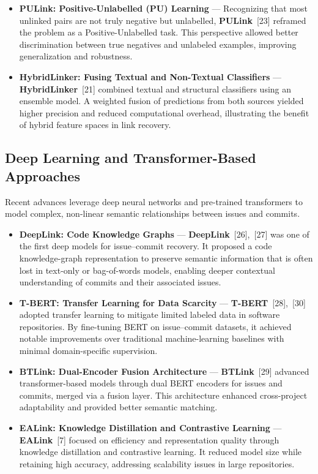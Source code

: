 \begin{itemize}
    \item \textbf{PULink: Positive-Unlabelled (PU) Learning} --- Recognizing that most unlinked pairs are not truly negative but unlabelled, \textbf{PULink}~[23] reframed the problem as a Positive-Unlabelled task. This perspective allowed better discrimination between true negatives and unlabeled examples, improving generalization and robustness.
    \item \textbf{HybridLinker: Fusing Textual and Non-Textual Classifiers} --- \textbf{HybridLinker}~[21] combined textual and structural classifiers using an ensemble model. A weighted fusion of predictions from both sources yielded higher precision and reduced computational overhead, illustrating the benefit of hybrid feature spaces in link recovery.
\end{itemize}

\subsection{Deep Learning and Transformer-Based Approaches}
Recent advances leverage deep neural networks and pre-trained transformers to model complex, non-linear semantic relationships between issues and commits.
\begin{itemize}
    \item \textbf{DeepLink: Code Knowledge Graphs} --- \textbf{DeepLink}~[26],~[27] was one of the first deep models for issue–commit recovery. It proposed a code knowledge-graph representation to preserve semantic information that is often lost in text-only or bag-of-words models, enabling deeper contextual understanding of commits and their associated issues.
    \item \textbf{T-BERT: Transfer Learning for Data Scarcity} --- \textbf{T-BERT}~[28],~[30] adopted transfer learning to mitigate limited labeled data in software repositories. By fine-tuning BERT on issue–commit datasets, it achieved notable improvements over traditional machine-learning baselines with minimal domain-specific supervision.
    \item \textbf{BTLink: Dual-Encoder Fusion Architecture} --- \textbf{BTLink}~[29] advanced transformer-based models through dual BERT encoders for issues and commits, merged via a fusion layer. This architecture enhanced cross-project adaptability and provided better semantic matching.
    \item \textbf{EALink: Knowledge Distillation and Contrastive Learning} --- \textbf{EALink}~[7] focused on efficiency and representation quality through knowledge distillation and contrastive learning. It reduced model size while retaining high accuracy, addressing scalability issues in large repositories.
\end{itemize}

